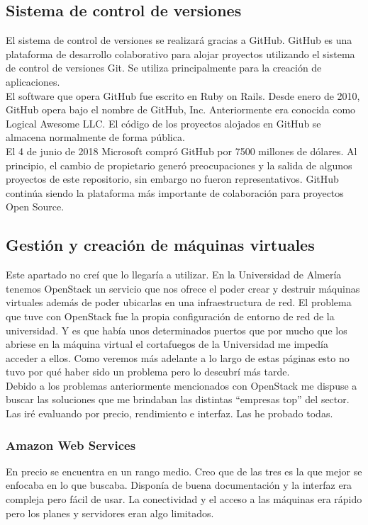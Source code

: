 \subsection{Sistema de control de versiones}
El sistema de control de versiones se realizará gracias a GitHub. GitHub es una plataforma de desarrollo colaborativo para alojar proyectos utilizando el sistema de control de versiones Git. Se utiliza principalmente para la creación de aplicaciones. 
\\El software que opera GitHub fue escrito en Ruby on Rails. Desde enero de 2010, GitHub opera bajo el nombre de GitHub, Inc. Anteriormente era conocida como Logical Awesome LLC. El código de los proyectos alojados en GitHub se almacena normalmente de forma pública.
\\El 4 de junio de 2018 Microsoft compró GitHub por 7500 millones de dólares. Al principio, el cambio de propietario generó preocupaciones y la salida de algunos proyectos de este repositorio, sin embargo no fueron representativos. GitHub continúa siendo la plataforma más importante de colaboración para proyectos Open Source.

\subsection{Gestión y creación de máquinas virtuales}

Este apartado no creí que lo llegaría a utilizar. En la Universidad de Almería tenemos OpenStack un servicio que nos ofrece el poder crear y destruir máquinas virtuales además de poder ubicarlas en una infraestructura de red. El problema que tuve con OpenStack fue la propia configuración de entorno de red de la universidad. Y es que había unos determinados puertos que por mucho que los abriese en la máquina virtual el cortafuegos de la Universidad me impedía acceder a ellos. Como veremos más adelante a lo largo de estas páginas esto no tuvo por qué haber sido un problema pero lo descubrí más tarde.
\\Debido a los problemas anteriormente mencionados con OpenStack me dispuse a buscar las soluciones que me brindaban las distintas ``empresas top'' del sector.
\\Las iré evaluando por precio, rendimiento e interfaz. Las he probado todas.

\subsubsection{Amazon Web Services}
En precio se encuentra en un rango medio. Creo que de las tres es la que mejor se enfocaba en lo que buscaba. Disponía de buena documentación y la interfaz era compleja pero fácil de usar. La conectividad y el acceso a las máquinas era rápido pero los planes y servidores eran algo limitados.
